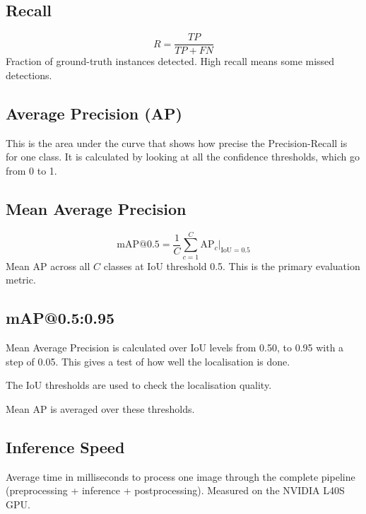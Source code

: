 \subsection{Recall}
\begin{equation}
R = \frac{TP}{TP + FN}
\end{equation}
Fraction of ground-truth instances detected. High recall means some missed detections.

\subsection{Average Precision (AP)}
This is the area under the curve that shows how precise the Precision-Recall is for one class. It is calculated by looking at all the confidence thresholds, which go from 0 to 1.

\subsection{Mean Average Precision}
\begin{equation}
\text{mAP@0.5} = \frac{1}{C}\sum_{c=1}^{C} \text{AP}_c \Big|_{\text{IoU}=0.5}
\end{equation}
Mean AP across all $C$ classes at IoU threshold 0.5. This is the primary evaluation metric.

\subsection{mAP@0.5:0.95}
Mean Average Precision is calculated over IoU levels from 0.50, to 0.95 with a step of 0.05. This gives a test of how well the localisation is done.

The IoU thresholds are used to check the localisation quality.

Mean AP is averaged over these thresholds.

\subsection{Inference Speed}
Average time in milliseconds to process one image through the complete pipeline (preprocessing + inference + postprocessing). Measured on the NVIDIA L40S GPU.
